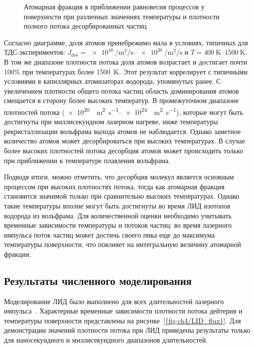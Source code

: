 \begin{figure}[ht]
    \caption{Атомарная фракция в приближении равновесия процессов у поверхности при различных значениях температуры и плотности полного потока десорбированных частиц}\label{fig:ch4/atomic_fraction_diagram}
\end{figure}

Согласно диаграмме, доля атомов пренебрежимо мала в условиях, типичных для ТДС-экспериментов: \(J_\mathrm{des} = \SIrange{e16}{e20}{\per\meter\squared\per\second}\) и \( T = \SIrange{400}{1500}{\kelvin} \). В том же диапазоне плотности потока доля атомов возрастает и достигает почти 100\% при температурах более \SI{1500}{\kelvin}. Этот результат коррелирует с типичными условиями в капиллярных атомизаторах водорода, упомянутых ранее. С увеличением плотности общего потока частиц область доминирования атомов смещается в сторону более высоких температур. В промежуточном диапазоне плотностей потока (\SIrange{e20}{e24}{\per\meter\squared\per\second}), которые могут быть достигнуты при миллисекундном лазерном нагреве, ниже температуры рекристаллизации вольфрама выхода атомов не наблюдается. Однако заметное количество атомов может десорбироваться при высоких температурах. В случае более высоких плотностей потока десорбция атомов может происходить только при приближении к температуре плавления вольфрама.

Подводя итоги, можно отметить, что десорбция молекул является основным процессом при высоких плотностях потока, тогда как атомарная фракция становится значимой только при сравнительно высоких температурах. Однако такие температуры вполне могут быть достигнуты во время ЛИД изотопов водорода из вольфрама. Для количественной оценки необходимо учитывать временные зависимости температуры и потоков частиц: во время лазерного импульса поток частиц может достичь своего пика еще до максимума температуры поверхности, что повлияет на интегральную величину атомарной фракции.

\subsection{Результаты численного моделирования}\label{subsec:ch4/seс2/subsec3}

Моделирование ЛИД было выполнено для всех длительностей лазерного импульса~\cite{Kulagin2022b}. Характерные временные зависимости плотности потока дейтерия и температуры поверхности представлены на рисунке~\cref{{fig:ch4/LID_flux}}. Для демонстрации значений плотности потока при ЛИД приведены результаты только для наносекундного и миллисекундного диапазонов длительностей.

